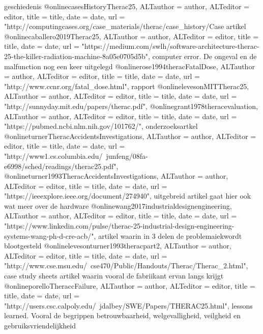 \cite{}
geschiedenis
@online{casesHistoryTherac25,	ALTauthor = {author},	ALTeditor = {editor},	title = {title},	date = {date},	url = {"http://computingcases.org/case_materials/therac/case_history/Case%
\cite{casesHistoryTherac25}
artikel
@online{caballero2019Therac25,	ALTauthor = {author},	ALTeditor = {editor},	title = {title},	date = {date},	url = {"https://medium.com/swlh/software-architecture-therac-25-the-killer-radiation-machine-8a05e0705d5b"},}
\cite{caballero2019Therac25}
computer error. De ongeval en de malfunction nog een keer uitgelegd
@online{rose1994theracFatalDose,	ALTauthor = {author},	ALTeditor = {editor},	title = {title},	date = {date},	url = {"http://www.ccnr.org/fatal_dose.html"},}
\cite{rose1994theracFatalDose}
rapport
@online{levesonMITTherac25,	ALTauthor = {author},	ALTeditor = {editor},	title = {title},	date = {date},	url = {"http://sunnyday.mit.edu/papers/therac.pdf"},}
\cite{levesonMITTherac25}
@online{grant1978theracevaluation,	ALTauthor = {author},	ALTeditor = {editor},	title = {title},	date = {date},	url = {"https://pubmed.ncbi.nlm.nih.gov/101762/"},}
\cite{grant1978theracevaluation}
onderzoeksartkel
@online{turnerTheracAccidentsInvestigations,	ALTauthor = {author},	ALTeditor = {editor},	title = {title},	date = {date},	url = {"http://www1.cs.columbia.edu/~junfeng/08fa-e6998/sched/readings/therac25.pdf"},}
\cite{turnerTheracAccidentsInvestigations}
@online{turner1993TheracAccidentsInvestigations,	ALTauthor = {author},	ALTeditor = {editor},	title = {title},	date = {date},	url = {"https://ieeexplore.ieee.org/document/274940"},}
\cite{turner1993TheracAccidentsInvestigations}
uitgebreid artikel gaat hier ook wat meer over de hardware
@online{wang2017industrialdesignengineering,	ALTauthor = {author},	ALTeditor = {editor},	title = {title},	date = {date},	url = {"https://www.linkedin.com/pulse/therac-25-industrial-design-engineering-systems-wang-ph-d-cre-acb/"},}
\cite{wang2017industrialdesignengineering}
artikel waarin in 3 delen de problemaiekwordt blootgesteld
@online{levesonturner1993theracpart2,	ALTauthor = {author},	ALTeditor = {editor},	title = {title},	date = {date},	url = {"http://www.cse.msu.edu/~cse470/Public/Handouts/Therac/Therac_2.html"},}
\cite{levesonturner1993theracpart2}
case study sheets
artikel waarin vooral de fabriikant ervan langs krijgt
@online{porelloTheraccFailure,	ALTauthor = {author},	ALTeditor = {editor},	title = {title},	date = {date},	url = {"http://users.csc.calpoly.edu/~jdalbey/SWE/Papers/THERAC25.html"},}
\cite{porelloTheraccFailure}
lessons learned. Vooral de begrippen betrouwbaarheid, welgevalligheid, veilgheid en gebruiksvriendelijkheid
}}
